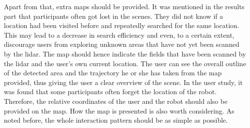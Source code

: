 Apart from that, extra maps should be provided. It was mentioned in the results part that participants often got lost in the scenes. They did not know if a location had been visited before and repeatedly searched for the same location. This may lead to a decrease in search efficiency and even, to a certain extent, discourage users from exploring unknown areas that have not yet been scanned by the \gls{lidar}. The map should hence indicate the fields that have been scanned by the \gls{lidar} and the user's own current location. The user can see the overall outline of the detected area and the trajectory he or she has taken from the map provided, thus giving the user a clear overview of the scene. In the user study, it was found that some participants often forget the location of the robot. Therefore, the relative coordinates of the user and the robot should also be provided on the map. How the map is presented is also worth considering. As noted before, the whole interaction pattern should be as simple as possible.
